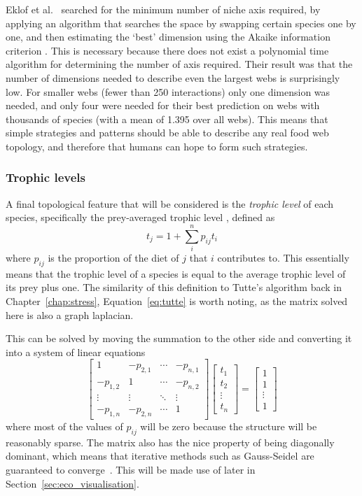 Eklof et al.\ \cite{Eklof2013} searched for the minimum number of niche axis required, by applying an algorithm that searches the space by swapping certain species one by one, and then estimating the `best' dimension using the Akaike information criterion \cite{Eklof2013}. This is necessary because there does not exist a polynomial time algorithm for determining the number of axis required.
Their result was that the number of dimensions needed to describe even the largest webs is surprisingly low. For smaller webs (fewer than 250 interactions) only one dimension was needed, and only four were needed for their best prediction on webs with thousands of species (with a mean of 1.395 over all webs).
This means that simple strategies and patterns should be able to describe any real food web topology, and therefore that humans can hope to form such strategies.

\subsubsection{Trophic levels}
A final topological feature that will be considered is the \emph{trophic level} of each species, specifically the prey-averaged trophic level \cite{Williams2004}, defined as
\begin{equation}
  t_j = 1 + \sum_i^n p_{ij}t_i
\end{equation}
where $p_{ij}$ is the proportion of the diet of $j$ that $i$ contributes to. This essentially means that the trophic level of a species is equal to the average trophic level of its prey plus one.
The similarity of this definition to Tutte's algorithm back in Chapter~\ref{chap:stress}, Equation~\eqref{eq:tutte} is worth noting, as the matrix solved here is also a graph laplacian.

This can be solved by moving the summation to the other side and converting it into a system of linear equations
\begin{equation}
    \begin{bmatrix}
    1&-p_{2,1}&\cdots&-p_{n,1}\\
    -p_{1,2}&1&\cdots&-p_{n,2}\\
    \vdots&\vdots&\ddots&\vdots\\
    -p_{1,n}&-p_{2,n}&\cdots&1
    \end{bmatrix}
    \begin{bmatrix}
    t_1\\t_2\\\vdots\\t_n
    \end{bmatrix}
    =
    \begin{bmatrix}
    1\\1\\\vdots\\1
    \end{bmatrix}
\end{equation}
where most of the values of $p_{ij}$ will be zero because the structure will be reasonably sparse.
The matrix also has the nice property of being diagonally dominant, which means that iterative methods such as Gauss-Seidel are guaranteed to converge~\cite{Young2014}. This will be made use of later in Section~\ref{sec:eco_visualisation}.

